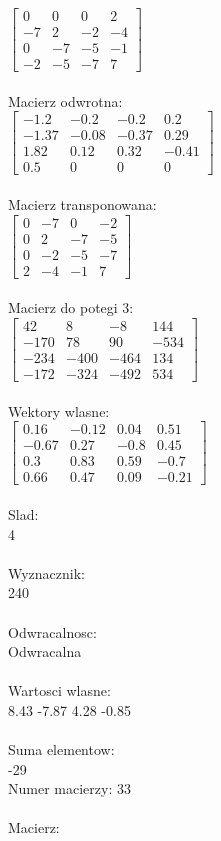 \documentclass[a4paper,12pt]{article}
\begin{document}
$\begin{bmatrix} 0&0&0&2\\-7&2&-2&-4\\0&-7&-5&-1\\-2&-5&-7&7 \end{bmatrix}$
\\
\\
Macierz odwrotna:\\

$\begin{bmatrix} -1.2&-0.2&-0.2&0.2\\-1.37&-0.08&-0.37&0.29\\1.82&0.12&0.32&-0.41\\0.5&0&0&0 \end{bmatrix}$
\\
\\
Macierz transponowana:\\

$\begin{bmatrix} 0&-7&0&-2\\0&2&-7&-5\\0&-2&-5&-7\\2&-4&-1&7 \end{bmatrix}$
\\
\\
Macierz do potegi 3:\\

$\begin{bmatrix} 42&8&-8&144\\-170&78&90&-534\\-234&-400&-464&134\\-172&-324&-492&534 \end{bmatrix}$
\\
\\
Wektory wlasne:\\

$\begin{bmatrix} 0.16&-0.12&0.04&0.51\\-0.67&0.27&-0.8&0.45\\0.3&0.83&0.59&-0.7\\0.66&0.47&0.09&-0.21 \end{bmatrix}$
\\
\\
Slad:\\
4
\\
\\
Wyznacznik:\\
240
\\
\\
Odwracalnosc:\\
Odwracalna
\\
\\
Wartosci wlasne:\\
8.43 -7.87 4.28 -0.85
\\
\\
Suma elementow:\\
-29
\\
\newpage
Numer macierzy:
33
\\
\\
Macierz:\\
\end{document}
